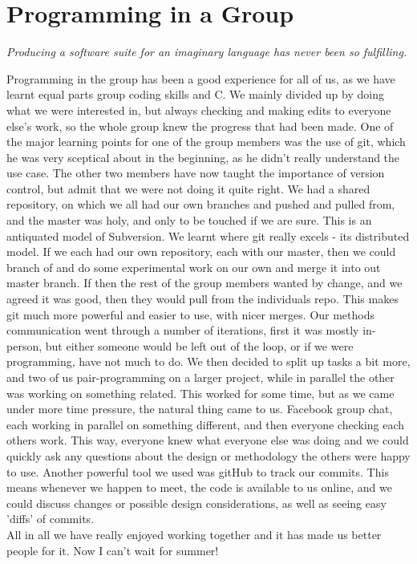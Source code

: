 \documentclass[11pt]{report}
\begin{document}
\section*{Programming in a Group}

\begin{center}\textit{Producing a software suite for an imaginary language has never been so fulfilling.} \end{center}
Programming in the group has been a good experience for all of us, as we have 
learnt equal parts group coding skills and C. We mainly divided up by doing 
what we were interested in, but always checking and making edits to everyone 
else's work, so the whole group knew the progress that had been made. One of 
the major learning points for one of the group members was the use of git, which 
he was very sceptical about in the beginning, as he didn't really understand the 
use case. The other two members have now taught the importance of version 
control, but admit that we were not doing it quite right. We had a shared 
repository, on which we all had our own branches and pushed and pulled from, 
and the master was holy, and only to be touched if we are sure. This is an 
antiquated model of Subversion. We learnt where git really excels -  its 
distributed model. If we each had our own repository, each with our master, 
then we could branch of and do some experimental work on our own and merge it 
into out master branch. If then the rest of the group members wanted by change, 
and we agreed it was good, then they would pull from the individuals repo. This 
makes git much more powerful and easier to use, with nicer merges. Our methods 
communication went through a number of iterations, first it was mostly 
in-person, but either someone would be left out of the loop, or if we were 
programming, have not much to do. We then decided to split up tasks a bit more, 
and two of us pair-programming on a larger project, while in parallel the other 
was working on something related. This worked for some time, but as we came 
under more time pressure, the natural thing came to us. Facebook group chat, 
each working in parallel on something different, and then everyone checking each 
others work. This way, everyone knew what everyone else was doing and we could 
quickly ask any questions about the design or methodology the others were happy 
to use. Another powerful tool we used was gitHub to track our commits. This 
means whenever we happen to meet, the code is available to us online, and we 
could discuss changes or possible design considerations, as well as seeing easy 
'diffs' of commits.\\
All in all we have really enjoyed working together and it has made us better people for it. Now I can't wait for summer!
\end{document}
